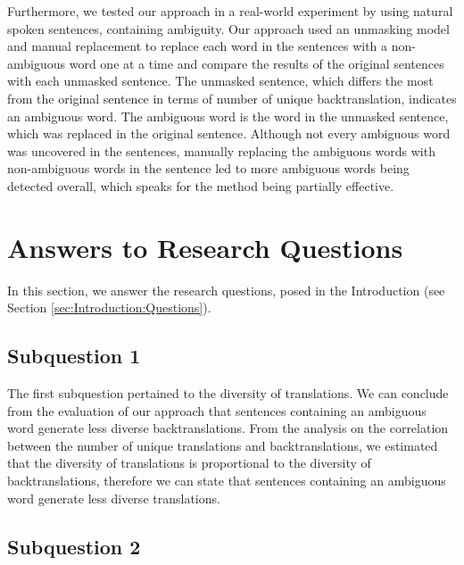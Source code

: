 Furthermore, we tested our approach in a real-world experiment by using natural spoken sentences, containing ambiguity. Our approach used an unmasking model and manual replacement to replace each word in the sentences with a non-ambiguous word one at a time and compare the results of the original sentences with each unmasked sentence. The unmasked sentence, which differs the most from the original sentence in terms of number of unique backtranslation, indicates an ambiguous word. The ambiguous word is the word in the unmasked sentence, which was replaced in the original sentence. Although not every ambiguous word was uncovered in the sentences, manually replacing the ambiguous words with non-ambiguous words in the sentence led to more ambiguous words being detected overall, which speaks for the method being partially effective.

\section{Answers to Research Questions}
\label{sec:Conclusion:Answers}

In this section, we answer the research questions, posed in the Introduction (see Section \ref{sec:Introduction:Questions}).

\subsection{Subquestion 1} %
\label{sec:Discussion:Answers:1}

The first subquestion pertained to the diversity of translations. We can conclude from the evaluation of our approach that sentences containing an ambiguous word generate less diverse backtranslations. From the analysis on the correlation between the number of unique translations and backtranslations, we estimated that the diversity of translations is proportional to the diversity of backtranslations, therefore we can state that sentences containing an ambiguous word generate less diverse translations.

\subsection{Subquestion 2} %
\label{sec:Discussion:Answers:2}

